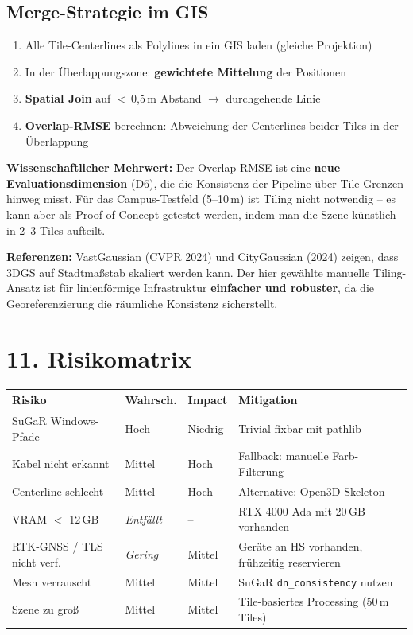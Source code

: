 \documentclass[11pt, a4paper]{article}
\begin{document}
\subsection{Merge-Strategie im GIS}
\begin{enumerate}[noitemsep]
    \item Alle Tile-Centerlines als Polylines in ein GIS laden (gleiche Projektion)
    \item In der \"Uberlappungszone: \textbf{gewichtete Mittelung} der Positionen
    \item \textbf{Spatial Join} auf $<$\,0{,}5\,m Abstand $\rightarrow$ durchgehende Linie
    \item \textbf{Overlap-RMSE} berechnen: Abweichung der Centerlines beider Tiles in der \"Uberlappung
\end{enumerate}

\begin{tcolorbox}[colback=notebg, colframe=noteblue]
\textbf{Wissenschaftlicher Mehrwert:} Der Overlap-RMSE ist eine \textbf{neue Evaluationsdimension} (D6), die die Konsistenz der Pipeline \"uber Tile-Grenzen hinweg misst. F\"ur das Campus-Testfeld (5--10\,m) ist Tiling nicht notwendig -- es kann aber als Proof-of-Concept getestet werden, indem man die Szene k\"unstlich in 2--3 Tiles aufteilt.
\end{tcolorbox}

\textbf{Referenzen:} VastGaussian (CVPR 2024) und CityGaussian (2024) zeigen, dass 3DGS auf Stadtma\ss stab skaliert werden kann. Der hier gew\"ahlte manuelle Tiling-Ansatz ist f\"ur linienf\"ormige Infrastruktur \textbf{einfacher und robuster}, da die Georeferenzierung die r\"aumliche Konsistenz sicherstellt.

\section{11. Risikomatrix}

\begin{center}
\small
\begin{tabular}{|p{3.5cm}|p{2cm}|p{1.5cm}|p{5.5cm}|}
\hline
\textbf{Risiko} & \textbf{Wahrsch.} & \textbf{Impact} & \textbf{Mitigation} \\
\hline
SuGaR Windows-Pfade & Hoch & Niedrig & Trivial fixbar mit pathlib \\
\hline
Kabel nicht erkannt & Mittel & Hoch & Fallback: manuelle Farb-Filterung \\
\hline
Centerline schlecht & Mittel & Hoch & Alternative: Open3D Skeleton \\
\hline
VRAM $<$ 12\,GB & \textit{Entf\"allt} & -- & RTX 4000 Ada mit 20\,GB vorhanden \\
\hline
RTK-GNSS / TLS nicht verf. & \textit{Gering} & Mittel & Ger\"ate an HS vorhanden, fr\"uhzeitig reservieren \\
\hline
Mesh verrauscht & Mittel & Mittel & SuGaR \texttt{dn\_consistency} nutzen \\
\hline
Szene zu gro\ss{} & Mittel & Mittel & Tile-basiertes Processing (50\,m Tiles) \\
\hline
\end{tabular}
\end{center}
\end{document}
